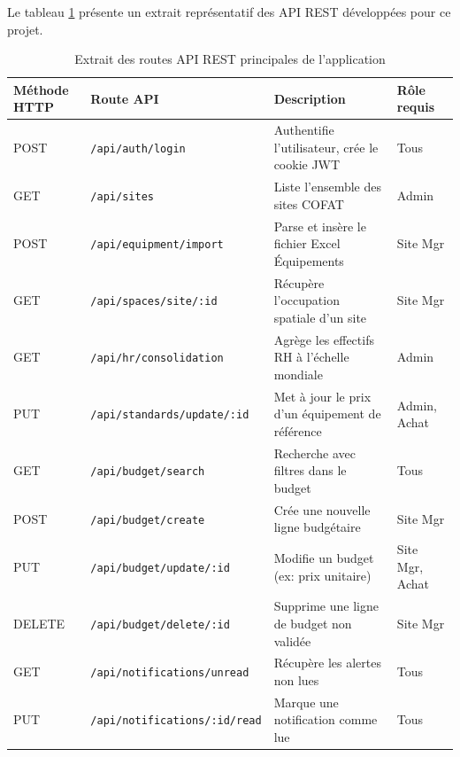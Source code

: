 Le tableau \ref{tab:api_endpoints} présente un extrait représentatif des API REST développées pour ce projet.

\begin{table}[h]
\centering
\begin{tabular}{|p{2.5cm}|p{6cm}|p{4.5cm}|p{2cm}|}
\hline
\textbf{Méthode HTTP} & \textbf{Route API} & \textbf{Description} & \textbf{Rôle requis} \\ \hline
POST & \texttt{/api/auth/login} & Authentifie l'utilisateur, crée le cookie JWT & Tous \\ \hline
GET & \texttt{/api/sites} & Liste l'ensemble des sites COFAT & Admin \\ \hline
POST & \texttt{/api/equipment/import} & Parse et insère le fichier Excel Équipements & Site Mgr \\ \hline
GET & \texttt{/api/spaces/site/:id} & Récupère l'occupation spatiale d'un site & Site Mgr \\ \hline
GET & \texttt{/api/hr/consolidation} & Agrège les effectifs RH à l'échelle mondiale & Admin \\ \hline
PUT & \texttt{/api/standards/update/:id} & Met à jour le prix d'un équipement de référence & Admin, Achat \\ \hline
GET & \texttt{/api/budget/search} & Recherche avec filtres dans le budget & Tous \\ \hline
POST & \texttt{/api/budget/create} & Crée une nouvelle ligne budgétaire & Site Mgr \\ \hline
PUT & \texttt{/api/budget/update/:id} & Modifie un budget (ex: prix unitaire) & Site Mgr, Achat \\ \hline
DELETE & \texttt{/api/budget/delete/:id} & Supprime une ligne de budget non validée & Site Mgr \\ \hline
GET & \texttt{/api/notifications/unread} & Récupère les alertes non lues & Tous \\ \hline
PUT & \texttt{/api/notifications/:id/read} & Marque une notification comme lue & Tous \\ \hline
\end{tabular}
\caption{Extrait des routes API REST principales de l'application}
\label{tab:api_endpoints}
\end{table}

